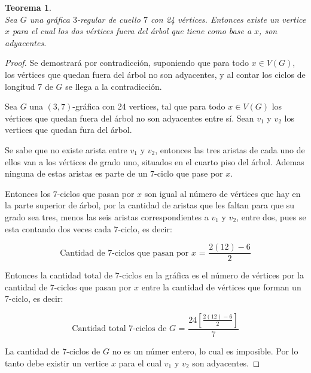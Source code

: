 \documentclass[12pt]{book}
\newtheorem{theorem}{Teorema}
\theoremstyle{definition}
\begin{document}
\begin{figure}
  \centering
  \caption{} \label{arbol(3,7)mas2}
\end{figure}



\begin{theorem}\textbf{}\\\label{teoexistex}
Sea $G$ una gráfica $3$-regular de cuello $7$ con 24
vértices. Entonces existe un vertice $x$ para el cual los dos vértices
fuera del árbol que tiene como base a $x$, son adyacentes.
\end{theorem}


\begin{proof}
Se demostrará por contradicción, suponiendo que para todo $x\in V(G)$,
los vértices que quedan fuera del árbol no son adyacentes, y al contar
los ciclos de longitud 7 de $G$ se llega a la contradicción.  


Sea $G$ una $(3,7)$-gráfica con 24 vertices, tal que para todo $x\in V(G)$ los
vértices que quedan fuera del árbol no son adyacentes entre sí. Sean
$v_1$ y $v_2$ los vertices que quedan fura del árbol.

Se sabe que no existe arista entre $v_1$
y $v_2$, entonces las tres aristas de cada uno de ellos van a los
vértices de grado uno, situados en el cuarto piso del árbol. Ademas
ninguna de estas aristas es parte de un
$7$-ciclo que pase por $x$.

Entonces los $7$-ciclos que pasan por $x$
son igual al número de vértices que hay en la parte superior de árbol,
por la cantidad de aristas que les faltan para que su grado sea tres, menos
las seis aristas correspondientes a $v_1$ y $v_2$, entre dos, pues se
esta contando dos veces cada $7$-ciclo, es decir:

\begin{equation*}
  \text{Cantidad de $7$-ciclos que pasan por $x$ = } \frac{2(12)-6}{2}
\end{equation*}


Entonces la cantidad total de $7$-ciclos en la gráfica es el número de
vértices por la cantidad de $7$-ciclos que pasan por $x$ entre la
cantidad de vértices que forman un $7$-ciclo, es decir:

\begin{equation*}
\text{Cantidad total 7-ciclos de $G$ = }\frac{24[\frac{2(12)-6}{2}]}{7} 
\end{equation*}

La cantidad de 7-ciclos de $G$ no es un númer entero, lo cual es
imposible. Por lo tanto debe existir un vertice $x$ para el cual $v_1$
y $v_2$ son adyacentes.
\end{proof}
\end{document}
